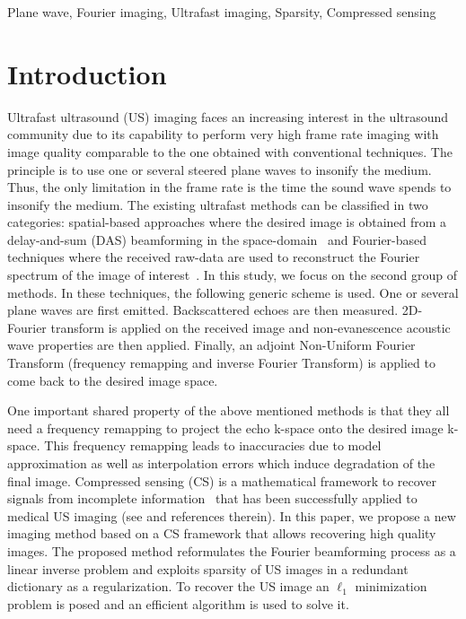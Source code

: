 \documentclass[conference]{IEEEtran}
\begin{document}
\begin{IEEEkeywords}
Plane wave, Fourier imaging, Ultrafast imaging, Sparsity, Compressed sensing
\end{IEEEkeywords}

\IEEEpeerreviewmaketitle



\section{Introduction}
\par Ultrafast ultrasound (US) imaging faces an increasing interest in the ultrasound community due to its capability to perform very high frame rate imaging with image quality comparable to the one obtained with conventional techniques. The principle is to use one or several steered plane waves to insonify the medium. Thus, the only limitation in the frame rate is the time the sound wave spends to insonify the medium. The existing ultrafast methods can be classified in two categories: spatial-based approaches where the desired image is obtained from a delay-and-sum (DAS) beamforming in the space-domain~\cite{Montaldo_UFFC_2014,Papadacci_uffc_2014} and Fourier-based techniques where the received raw-data are used to reconstruct the Fourier spectrum of the image of interest~\cite{Lu_UFFC_97,garcia_uffc_2013,Bernard_IUS_2014}. In this study, we focus on the second group of methods. In these techniques, the following generic scheme is used. One or several plane waves are first emitted. Backscattered echoes are then measured. 2D-Fourier transform is applied on the received image and non-evanescence acoustic wave properties are then applied. Finally, an adjoint Non-Uniform Fourier Transform (frequency remapping and inverse Fourier Transform) is applied to come back to the desired image space.

\par One important shared property of the above mentioned methods is that they all need a frequency remapping to project the echo k-space onto the desired image k-space. This frequency remapping leads to inaccuracies due to model approximation as well as interpolation errors which induce degradation of the final image. Compressed sensing (CS) is a mathematical framework to recover signals from incomplete information~\cite{Donoho_TIT_2006,candes06,fornasier11} that has been successfully applied to medical US imaging (see \cite{Friboulet_IUS_2010} and references therein). In this paper, we propose a new imaging method based on a CS framework that allows recovering high quality images. The proposed method reformulates the Fourier beamforming process as a linear inverse problem and exploits sparsity of US images in a redundant dictionary as a regularization. To recover the US image an $\ell_1$ minimization problem is posed and an efficient algorithm is used to solve it.
\end{document}
